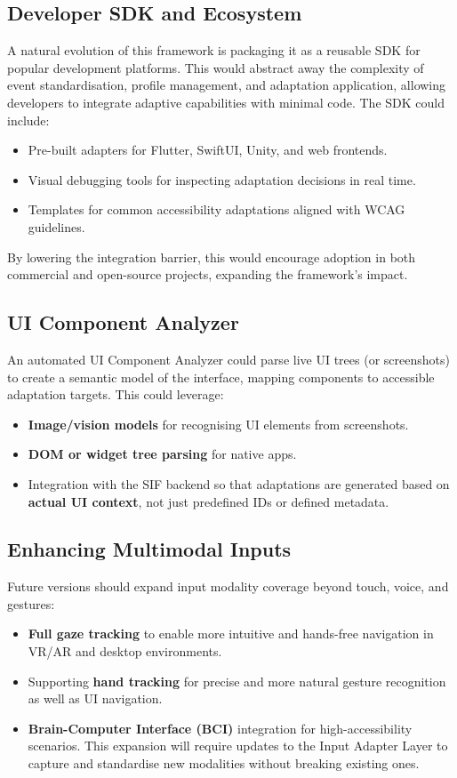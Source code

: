 \documentclass[openany]{book}
\begin{document}
\subsection{Developer SDK and Ecosystem}
A natural evolution of this framework is packaging it as a reusable SDK for popular development platforms. This would abstract away the complexity of event standardisation, profile management, and adaptation application, allowing developers to integrate adaptive capabilities with minimal code. The SDK could include:
\begin{itemize}
    \item Pre-built adapters for Flutter, SwiftUI, Unity, and web frontends.
    \item Visual debugging tools for inspecting adaptation decisions in real time.
    \item Templates for common accessibility adaptations aligned with WCAG guidelines.
\end{itemize}
By lowering the integration barrier, this would encourage adoption in both commercial and open-source projects, expanding the framework’s impact.

\subsection{UI Component Analyzer}
An automated UI Component Analyzer could parse live UI trees (or screenshots) to create a semantic model of the interface, mapping components to accessible adaptation targets. This could leverage:
\begin{itemize}
    \item \textbf{Image/vision models} for recognising UI elements from screenshots.
    \item \textbf{DOM or widget tree parsing} for native apps.
    \item Integration with the SIF backend so that adaptations are generated based on \textbf{actual UI context}, not just predefined IDs or defined metadata.
\end{itemize}

\subsection{Enhancing Multimodal Inputs}
Future versions should expand input modality coverage beyond touch, voice, and gestures:
\begin{itemize}
    \item \textbf{Full gaze tracking} to enable more intuitive and hands-free navigation in VR/AR and desktop environments.
    \item Supporting \textbf{hand tracking} for precise and more natural gesture recognition as well as UI navigation.
    \item \textbf{Brain-Computer Interface (BCI)} integration for high-accessibility scenarios. This expansion will require updates to the Input Adapter Layer to capture and standardise new modalities without breaking existing ones.
\end{itemize}
\end{document}
